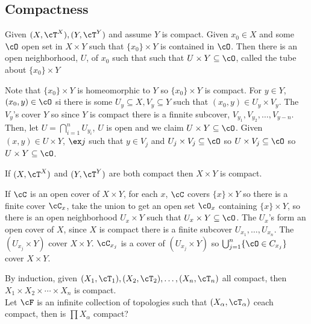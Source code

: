 
\subsection{Compactness}

\begin{proposition}
    Given $(X, \cT^X), (Y, \cT^Y)$ and assume $Y$ is compact. Given $x_0 \in X$ and some $\cO$ open set in $X \times Y$ such that $\{x_0\} \times Y$ is contained in $\cO$. Then there is an open neighborhood, $U$, of $x_0$ such that such that $U \times Y \subseteq \cO$, called the tube about $\{x_0\} \times Y$  
\end{proposition}

\begin{pf}
    Note that $\{x_0\} \times Y$ is homeomorphic to $Y$ so $\{x_0\} \times Y$ is compact. For $y \in Y$, $(x_0, y) \in \cO$ si there is some $U_y \subseteq X, V_y \subseteq Y$ such that $(x_0, y) \in U_y \times V_y$. The $V_y$'s cover $Y$ so since $Y$ is compact there is a finnite subcover, $V_{y_1}, V_{y_2}, \ldots, V_{y-n}$. Then, let $U = \bigcap_{i=1}^n U_{y_i}$, $U$ is open and we claim $U \times Y \subseteq \cO$. Given $(x,y) \in U \times Y$, $\ex j$ such that $y \in V_j$ and $U_j \times V_j \subseteq \cO$ so $U \times V_j \subseteq \cO$ so $U \times Y \subseteq \cO$. 
\end{pf}

\begin{theorem}
    If $(X, \cT^X)$ and $(Y, \cT^Y)$ are both compact then $X \times Y$ is compact. 
\end{theorem}

\begin{pf}
    If $\cC$ is an open cover of $X \times Y$, for each $x$, $\cC$ covers $\{x\} \times Y$ so there is a finite cover $\cC_x$, take the union to get an open set $\cO_x$ containing $\{x\} \times Y$, so there is an open neighborhood $U_x \times Y$ such that $U_x \times Y \subseteq \cO$. The $U_x$'s form an open cover of $X$, since $X$ is compact there is a finite subcover $U_{x_1}, \ldots, U_{x_n}$. The $(U_{x_j} \times Y)$ cover $X \times Y$. $\cC_{x_j}$ is a cover of $(U_{x_j} \times Y)$ so $\bigcup_{j=1}^n\{ \cO \in C_{x_j}\}$ cover $X \times Y$.
\end{pf}

\noindent
By induction, given $(X_1, \cT_1), (X_2, \cT_2), \ldots, (X_n, \cT_n)$ all compact, then $X_1 \times X_2 \times \cdots \times X_n$ is compact. \\
Let $\cF$ is an infinite collection of topologies such that $(X_{\alpha}, \cT_{\alpha})$ ceach compact, then is $\prod X_{\alpha}$ compact? 